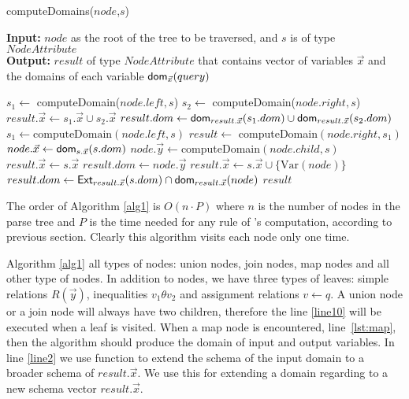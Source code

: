 \documentclass[12pt]{article}
\begin{document}
\begin{algorithm}[H]
\caption{computeDomains($node$,$s$)} 
\label{alg1}
\textbf{Input:} $node$ as the root of the tree to be traversed, and $s$ is of type $NodeAttribute$ \\
\textbf{Output:}  $result$ of type $NodeAttribute$ that contains vector of variables $\vec x$ and the domains of each variable $\textsf{dom}{}_{\vec x}(query)$
\begin{algorithmic}[1]
\STATE  $s_{1}\gets$ computeDomain($node.left, s$)
\STATE  $s_{2}\gets$ computeDomain($node.right, s$)
\STATE  $result.\vec{x}\gets s_{1}.\vec{x} \cup s_{2}.\vec{x}$ %
\STATE  $result.dom\gets \text{\textsf{dom}}_{result.\vec x}(s_{1}.dom)\cup\text{\textsf{dom}}_{result.\vec x}(s_{2}.dom)$
\label{line:join1}
\STATE  $s_{1} \gets \text{computeDomain}(node.left, s)$\label{line:join2}
\STATE $result\gets$ computeDomain$(node.right, s_{1})$
\label{lst:map}
\STATE $node.\vec{x}\gets\text{\textsf{dom}}_{s.\vec{x}}(s.dom)$
\STATE $node.\vec{y}\gets$computeDomain$(node.child,s)$\label{lst:child}
\STATE $result.\vec{x}\gets s.\vec{x}$
\STATE $result.dom\gets node.\vec{y}$
\ELSE 
\label{line10}
\STATE $result.\vec{x}\gets s.\vec{x} \cup \{\text{Var$(node)$}\}$\label{lst:setofallvar}
\STATE $result.dom\gets \text{\textsf{Ext}}_{result.\vec{x}}(s.dom)\cap\text{\textsf{dom}}_{result.\vec{x}}(node)$\label{line2}
\ENDIF
\RETURN $result$
\end{algorithmic}
\end{algorithm}
The order of Algorithm \ref{alg1} is $O(n\cdot P)$ where $n$ is the number of nodes in the parse tree and $P$ is the time needed for any rule of \dom{}'s computation, according to previous section. Clearly this algorithm visits each node only one time. \par

Algorithm \ref{alg1} all types of nodes: union nodes, join nodes, map nodes and all other type of nodes. In addition to nodes, we have three types of leaves: simple relations $R(\vec y)$, inequalities $v_{1}\theta v_{2}$ and assignment relations $v \gets q$. A union node or a join node will always have two children, therefore the line \ref{line10} will be executed when a leaf is visited. When a map node is encountered, line~\ref{lst:map}, then the algorithm should produce the domain of input and output variables. In line \ref{line2} we use function \Ext{} to extend the schema of the input domain to a broader schema of $result.\vec{x}$. We use this for extending a domain regarding to a new schema vector $result.\vec x$. 
\end{document}
